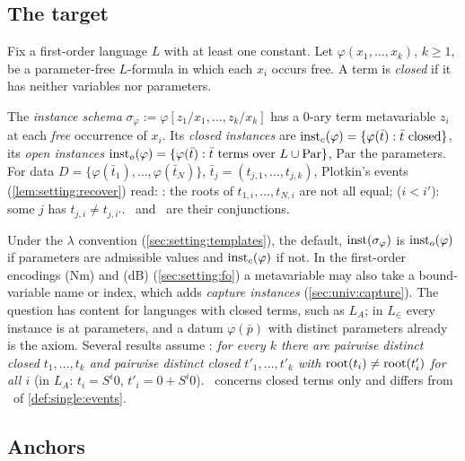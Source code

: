 \subsection{The target}\label{sec:univ:target}

Fix a first-order language $L$ with at least one constant. Let $\varphi(x_1,\dots,x_k)$, $k\ge1$, be a parameter-free $L$-formula in which each $x_i$ occurs free. A term is \emph{closed} if it has neither variables nor parameters.

\begin{definition}\label{def:univ:target}
The \emph{instance schema} $\sigma_\varphi:=\varphi[z_1/x_1,\allowbreak\dots,\allowbreak z_k/x_k]$ has a $0$-ary term metavariable $z_i$ at each \emph{free} occurrence of $x_i$. Its \emph{closed instances} are $\mathrm{inst}_{c}(\varphi)=\{\varphi(\bar t):\bar t\text{ closed}\}$, its \emph{open instances} $\mathrm{inst}_{o}(\varphi)=\{\varphi(\bar t):\bar t\text{ terms over }L\cup\mathrm{Par}\}$, $\mathrm{Par}$ the parameters. For data $D=\{\varphi(\bar t_1),\dots,\varphi(\bar t_N)\}$, $\bar t_j=(t_{j,1},\dots,t_{j,k})$, Plotkin's events (\cref{lem:setting:recover}) read: : the roots of $t_{1,i},\dots,t_{N,i}$ are not all equal;  ($i<i'$): some $j$ has $t_{j,i}\neq t_{j,i'}$. \evR\ and \evD\ are their conjunctions.
\end{definition}

Under the $\lambda$ convention (\cref{sec:setting:templates}), the default, $\mathrm{inst}(\sigma_\varphi)$ is $\mathrm{inst}_{o}(\varphi)$ if parameters are admissible values and $\mathrm{inst}_{c}(\varphi)$ if not. In the first-order encodings (Nm) and (dB) (\cref{sec:setting:fo}) a metavariable may also take a bound-variable name or index, which adds \emph{capture instances} (\cref{sec:univ:capture}). The question has content for languages with closed terms, such as $L_A$; in $L_\in$ every instance is at parameters, and a datum $\varphi(\bar p)$ with distinct parameters already is the axiom. Several results assume \univRich: \emph{for every $k$ there are pairwise distinct closed $t_1,\dots,t_k$ and pairwise distinct closed $t'_1,\dots,t'_k$ with $\mathrm{root}(t_i)\neq\mathrm{root}(t'_i)$ for all $i$} (in $L_A$: $t_i=S^i0$, $t'_i=0+S^i0$). \univRich\ concerns closed terms only and differs from \Rich\ of \cref{def:single:events}.

\subsection{Anchors}\label{sec:univ:anchor}

